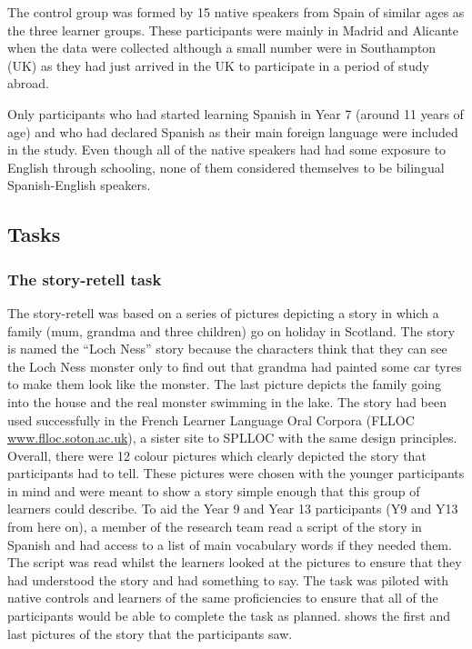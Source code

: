 \documentclass[output=paper]{langscibook}
\begin{document}
The control group was formed by 15 native speakers from Spain of similar ages as the three learner groups. These participants were mainly in Madrid and Alicante when the data were collected although a small number were in Southampton (UK) as they had just arrived in the UK to participate in a period of study abroad.

Only participants who had started learning Spanish in Year 7 (around 11 years of age) and who had declared Spanish as their main foreign language were included in the study. Even though all of the native speakers had had some exposure to English through schooling, none of them considered themselves to be bilingual Spanish-English speakers.

\subsection{Tasks}\largerpage
\subsubsection{The story-retell task}

The story-retell was based on a series of pictures depicting a story in which a family (mum, grandma and three children) go on holiday in Scotland. The story is named the ``Loch Ness'' story because the characters think that they can see the Loch Ness monster only to find out that grandma had painted some car tyres to make them look like the monster. The last picture depicts the family going into the house and the real monster swimming in the lake. The story had been used successfully in the French Learner Language Oral Corpora (FLLOC \href{http://www.flloc.soton.ac.uk}{{www.flloc.soton.ac.uk}}), a sister site to SPLLOC with the same design principles. Overall, there were 12 colour pictures which clearly depicted the story that participants had to tell. These pictures were chosen with the younger participants in mind and were meant to show a story simple enough that this group of learners could describe. To aid the Year 9 and Year 13 participants (Y9 and Y13 from here on), a member of the research team read a script of the story in Spanish and had access to a list of main vocabulary words if they needed them. The script was read whilst the learners looked at the pictures to ensure that they had understood the story and had something to say. The task was piloted with native controls and learners of the same proficiencies to ensure that all of the participants would be able to complete the task as planned.  shows the first and last pictures of the story that the participants saw.
\end{document}
